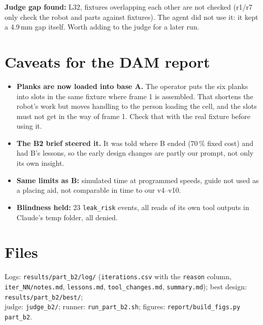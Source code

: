 \textbf{Judge gap found:} L32, fixtures overlapping each other are not checked (r1/r7 only check the robot and parts
against fixtures). The agent did not use it: it kept a 4.9\,mm gap itself. Worth adding to the judge for a later run.

\section{Caveats for the DAM report}
\begin{itemize}
\item \textbf{Planks are now loaded into base A.} The operator puts the six planks into slots in the same fixture
  where frame 1 is assembled. That shortens the robot's work but moves handling to the person loading the cell, and
  the slots must not get in the way of frame 1. Check that with the real fixture before using it.
\item \textbf{The B2 brief steered it.} It was told where B ended (70\,\% fixed cost) and had B's lessons, so the
  early design changes are partly our prompt, not only its own insight.
\item \textbf{Same limits as B:} simulated time at programmed speeds, guide not used as a placing aid, not comparable
  in time to our v4--v10.
\item \textbf{Blindness held:} 23 \texttt{leak\_risk} events, all reads of its own tool outputs in Claude's temp
  folder, all denied.
\end{itemize}

\section*{Files}
Logs: \texttt{results/part\_b2/log/} (\texttt{iterations.csv} with the \texttt{reason} column,
\texttt{iter\_NN/notes.md}, \texttt{lessons.md}, \texttt{tool\_changes.md}, \texttt{summary.md}); best design:
\texttt{results/part\_b2/best/};\\ judge: \texttt{judge\_b2/}; runner: \texttt{run\_part\_b2.sh}; figures:
\texttt{report/build\_figs.py part\_b2}.


